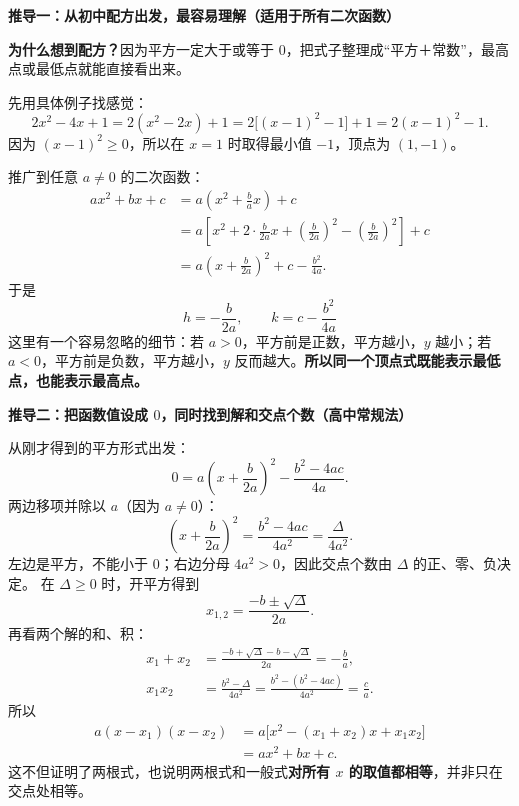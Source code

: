 \clearpage
\begin{proofbox}
\textbf{\textcolor{CProof}{推导一：从初中配方出发，最容易理解（适用于所有二次函数）}}


\textbf{为什么想到配方？}因为平方一定大于或等于 $0$，把式子整理成“平方＋常数”，最高点或最低点就能直接看出来。

先用具体例子找感觉：
\[
2x^2-4x+1=2(x^2-2x)+1
=2\bigl[(x-1)^2-1\bigr]+1=2(x-1)^2-1.
\]
因为 $(x-1)^2\ge0$，所以在 $x=1$ 时取得最小值 $-1$，顶点为 $(1,-1)$。

推广到任意 $a\ne0$ 的二次函数：
\[
\begin{aligned}
ax^2+bx+c
&=a\left(x^2+\frac ba x\right)+c\\
&=a\left[x^2+2\cdot\frac{b}{2a}x
      +\left(\frac{b}{2a}\right)^2
      -\left(\frac{b}{2a}\right)^2\right]+c\\
&=a\left(x+\frac{b}{2a}\right)^2
  +c-\frac{b^2}{4a}.
\end{aligned}
\]
于是
\[
\boxed{h=-\frac{b}{2a},\qquad k=c-\frac{b^2}{4a}}
\]
这里有一个容易忽略的细节：若 $a>0$，平方前是正数，平方越小，$y$ 越小；若 $a<0$，平方前是负数，平方越小，$y$ 反而越大。\textbf{所以同一个顶点式既能表示最低点，也能表示最高点。}

\medskip

\end{proofbox}
\clearpage
\begin{proofbox}
\textbf{\textcolor{CProof}{推导二：把函数值设成 $0$，同时找到解和交点个数（高中常规法）}}


从刚才得到的平方形式出发：
\[
0=a\left(x+\frac{b}{2a}\right)^2-\frac{b^2-4ac}{4a}.
\]
两边移项并除以 $a$（因为 $a\ne0$）：
\[
\left(x+\frac{b}{2a}\right)^2=\frac{b^2-4ac}{4a^2}=\frac{\Delta}{4a^2}.
\]
左边是平方，不能小于 $0$；右边分母 $4a^2>0$，因此交点个数由 $\Delta$ 的正、零、负决定。
在 $\Delta\ge0$ 时，开平方得到
\[
\boxed{x_{1,2}=\frac{-b\pm\sqrt{\Delta}}{2a}}.
\]
再看两个解的和、积：
\[
\begin{aligned}
x_1+x_2&=\frac{-b+\sqrt\Delta-b-\sqrt\Delta}{2a}=-\frac ba,\\
x_1x_2&=\frac{b^2-\Delta}{4a^2}
=\frac{b^2-(b^2-4ac)}{4a^2}=\frac ca.
\end{aligned}
\]
所以
\[
\begin{aligned}
a(x-x_1)(x-x_2)
&=a\bigl[x^2-(x_1+x_2)x+x_1x_2\bigr]\\
&=ax^2+bx+c.
\end{aligned}
\]
这不但证明了两根式，也说明两根式和一般式\textbf{对所有 $x$ 的取值都相等}，并非只在交点处相等。

\medskip

\end{proofbox}
